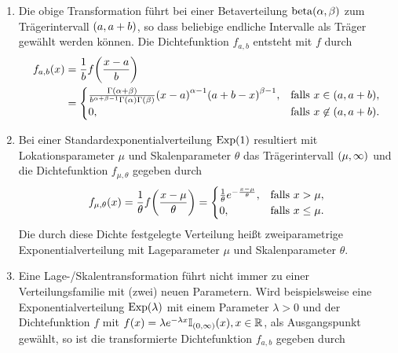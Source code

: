 \documentclass{lecture}
\begin{document}
    \begin{example}
        \begin{enumerate}
            \item Die obige Transformation führt bei einer Betaverteilung \(\betadist\parentheses*{\alpha, \beta}\) zum Trägerintervall \(\parentheses*{a, a + b}\), so dass beliebige endliche Intervalle als Träger gewählt werden können.
            Die Dichtefunktion \(f_{a, b}\) entsteht mit \(f\) durch
            \begin{align*}
                f_{a, b}\parentheses*{x} &= \frac{1}{b}f\parentheses*{\frac{x - a}{b}}\\
                &= \begin{cases}
                    \frac{\Gamma\parentheses*{\alpha + \beta}}{b^{\alpha + \beta - 1}\Gamma\parentheses*{\alpha}\Gamma\parentheses*{\beta}}\parentheses*{x - a}^{\alpha - 1}\parentheses*{a + b - x}^{\beta - 1}, & \text{falls }x \in \parentheses*{a, a + b},\\
                    0, & \text{falls }x \not\in \parentheses*{a, a + b}.
                \end{cases}
            \end{align*}
            \item Bei einer Standardexponentialverteilung \(\Exp\parentheses*{1}\) resultiert mit Lokationsparameter \(\mu\) und Skalenparameter \(\theta\) das Trägerintervall \(\parentheses*{\mu, \infty}\) und die Dichtefunktion \(f_{\mu, \theta}\) gegeben durch
            \[
                f_{\mu, \theta}\parentheses*{x} = \frac{1}{\theta}f\parentheses*{\frac{x - \mu}{\theta}} = \begin{cases}
                    \frac{1}{\theta}e^{-\frac{x - \mu}{\theta}}, & \text{falls }x > \mu,\\
                    0, & \text{falls }x \le \mu.
                \end{cases}
            \]
            Die durch diese Dichte festgelegte Verteilung heißt zweiparametrige Exponentialverteilung mit Lageparameter \(\mu\) und Skalenparameter \(\theta\).
            \item Eine Lage-/Skalentransformation führt nicht immer zu einer Verteilungsfamilie mit (zwei) neuen Parametern.
            Wird beispielsweise eine Exponentialverteilung \(\Exp\parentheses*{\lambda}\) mit einem Parameter \(\lambda > 0\) und der Dichtefunktion \(f\) mit \(f\parentheses*{x} = \lambda e^{-\lambda x}\mathbb{I}_{\parentheses*{0, \infty}}\parentheses*{x}, x \in \R\), als Ausgangspunkt gewählt, so ist die transformierte Dichtefunktion \(f_{a, b}\) gegeben durch

\end{enumerate}
\end{example}
\end{document}
